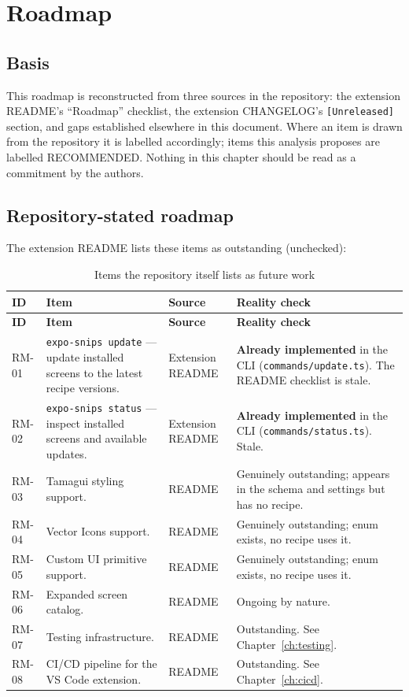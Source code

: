\chapter{Roadmap}
\label{ch:roadmap}

\section{Basis}

This roadmap is reconstructed from three sources in the repository: the
extension README's ``Roadmap'' checklist, the extension CHANGELOG's
\texttt{[Unreleased]} section, and gaps established elsewhere in this document.
Where an item is drawn from the repository it is labelled accordingly; items
this analysis proposes are labelled RECOMMENDED. Nothing in this chapter should
be read as a commitment by the authors.

\section{Repository-stated roadmap}

The extension README lists these items as outstanding (unchecked):

\begin{longtable}{@{}L{1.4cm}L{5.4cm}L{2.4cm}L{5.2cm}@{}}
\caption{Items the repository itself lists as future work}\\
\toprule
\textbf{ID} & \textbf{Item} & \textbf{Source} & \textbf{Reality check} \\
\midrule
\endfirsthead
\toprule
\textbf{ID} & \textbf{Item} & \textbf{Source} & \textbf{Reality check} \\
\midrule
\endhead
RM-01 & \texttt{expo-snips update} --- update installed screens to the latest
recipe versions. & Extension README & \textbf{Already implemented} in the CLI
(\texttt{commands/update.ts}). The README checklist is stale. \\
RM-02 & \texttt{expo-snips status} --- inspect installed screens and available
updates. & Extension README & \textbf{Already implemented} in the CLI
(\texttt{commands/status.ts}). Stale. \\
RM-03 & Tamagui styling support. & README & Genuinely outstanding; appears in the
schema and settings but has no recipe. \\
RM-04 & Vector Icons support. & README & Genuinely outstanding; enum exists, no
recipe uses it. \\
RM-05 & Custom UI primitive support. & README & Genuinely outstanding; enum
exists, no recipe uses it. \\
RM-06 & Expanded screen catalog. & README & Ongoing by nature. \\
RM-07 & Testing infrastructure. & README & Outstanding. See
Chapter~\ref{ch:testing}. \\
RM-08 & CI/CD pipeline for the VS Code extension. & README & Outstanding. See
Chapter~\ref{ch:cicd}. \\
\bottomrule
\end{longtable}

